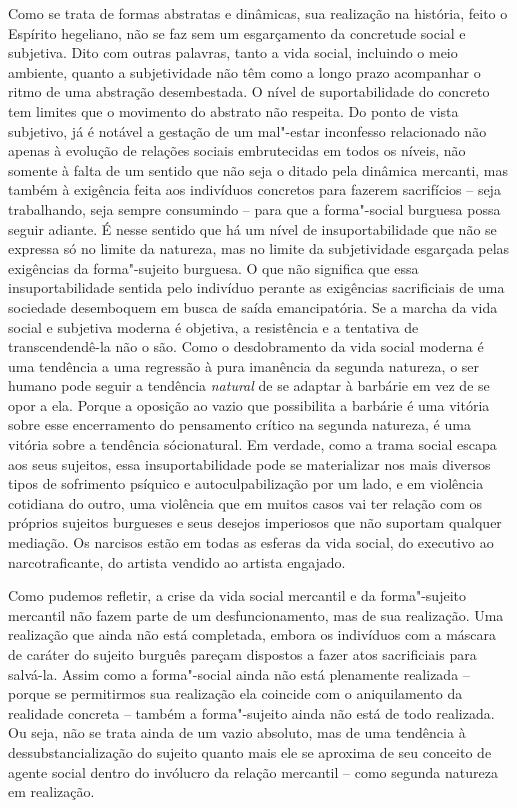 {Como se trata de formas abstratas e dinâmicas, sua realização na
história, feito o Espírito hegeliano, não se faz sem um esgarçamento da
concretude social e subjetiva. Dito com outras palavras, tanto a vida
social, incluindo o meio ambiente, quanto a subjetividade não têm como a
longo prazo acompanhar o ritmo de uma abstração desembestada. O nível de
suportabilidade do concreto tem limites que o movimento do abstrato não
respeita. Do ponto de vista subjetivo, já é notável a gestação de um
mal"-estar inconfesso relacionado não apenas à evolução de relações
sociais embrutecidas em todos os níveis, não somente à falta de um
sentido que não seja o ditado pela dinâmica mercanti, mas também à
exigência feita aos indivíduos concretos para fazerem sacrifícios --
seja trabalhando, seja sempre consumindo -- para que a forma"-social
burguesa possa seguir adiante. É nesse sentido que há um nível de
insuportabilidade que não se expressa só no limite da natureza, mas no
limite da subjetividade esgarçada pelas exigências da forma"-sujeito
burguesa. O que não significa que essa insuportabilidade sentida pelo
indivíduo perante as exigências sacrificiais de uma sociedade
desemboquem em busca de saída emancipatória. Se a marcha da vida social
e subjetiva moderna é objetiva, a resistência e a tentativa de
transcendendê-la não o são. Como o desdobramento da vida social moderna
é uma tendência a uma regressão à pura imanência da segunda natureza, o
ser humano pode seguir a tendência \emph{natural} de se adaptar à
barbárie em vez de se opor a ela. Porque a oposição ao vazio que
possibilita a barbárie é uma vitória sobre esse encerramento do
pensamento crítico na segunda natureza, é uma vitória sobre a tendência
sócionatural. Em verdade, como a trama social escapa aos seus sujeitos,
essa insuportabilidade pode se materializar nos mais diversos tipos de
sofrimento psíquico e autoculpabilização por um lado, e em violência
cotidiana do outro, uma violência que em muitos casos vai ter relação
com os próprios sujeitos burgueses e seus desejos imperiosos que não
suportam qualquer mediação. Os narcisos estão em todas as esferas da
vida social, do executivo ao narcotraficante, do artista vendido ao
artista engajado.

Como pudemos refletir, a crise da vida social mercantil e da
forma"-sujeito mercantil não fazem parte de um desfuncionamento, mas de
sua realização. Uma realização que ainda não está completada, embora os
indivíduos com a máscara de caráter do sujeito burguês pareçam dispostos
a fazer atos sacrificiais para salvá-la. Assim como a forma"-social ainda
não está plenamente realizada -- porque se permitirmos sua realização
ela coincide com o aniquilamento da realidade concreta -- também a
forma"-sujeito ainda não está de todo realizada. Ou seja, não se trata
ainda de um vazio absoluto, mas de uma tendência à dessubstancialização
do sujeito quanto mais ele se aproxima de seu conceito de agente social
dentro do invólucro da relação mercantil -- como segunda natureza em
realização.

}

